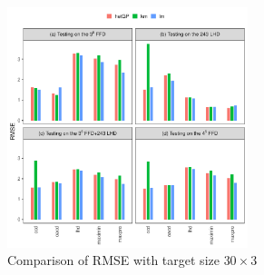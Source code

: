\documentclass{beamer}
\begin{document}
\begin{frame}
\begin{figure}%
\centering
\includegraphics[height=7cm]{../chapters/DE/pdfs/barplots1}
\caption{Comparison of RMSE with target size $30\times3$}
\label{barplots1}
\end{figure}
\end{frame}
\end{document}
